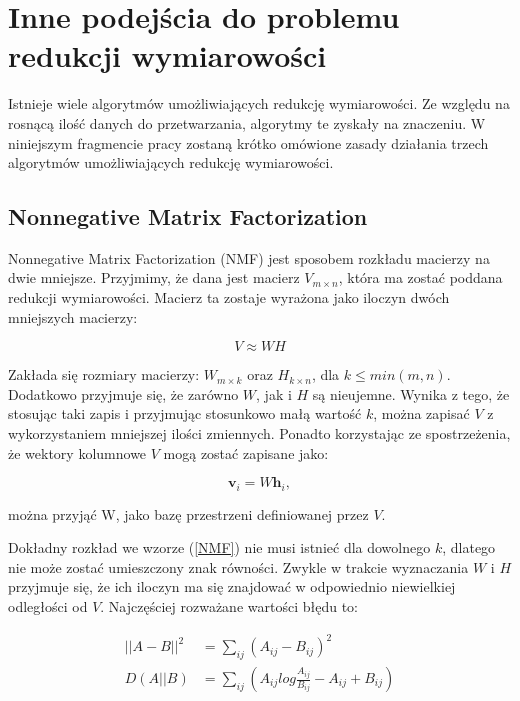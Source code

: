 \documentclass[oneside, eng]{mgr}
\newcommand{\bb}{\textbf}
\begin{document}
\section{Inne podejścia do problemu redukcji wymiarowości}
Istnieje wiele algorytmów umożliwiających redukcję wymiarowości. Ze względu na rosnącą ilość danych do przetwarzania, algorytmy te zyskały na znaczeniu. W niniejszym fragmencie pracy zostaną krótko omówione zasady działania trzech algorytmów umożliwiających redukcję wymiarowości.

\subsection{Nonnegative Matrix Factorization}

Nonnegative Matrix Factorization (NMF) jest sposobem rozkładu macierzy na dwie mniejsze. Przyjmimy, że dana jest macierz $V_{m \times n}$, która ma zostać poddana redukcji wymiarowości. Macierz ta zostaje wyrażona jako iloczyn dwóch mniejszych macierzy:

\begin{equation}
	V \approx WH
\label{NMF}
\end{equation}

Zakłada się rozmiary macierzy: $W_{m \times k}$ oraz $H_{k \times n}$, dla $k \leq min(m,n)$. Dodatkowo przyjmuje się, że zarówno $W$, jak i $H$ są nieujemne. Wynika z tego, że stosując taki zapis i przyjmując stosunkowo małą wartość $k$, można zapisać $V$ z wykorzystaniem mniejszej ilości zmiennych. Ponadto korzystając ze spostrzeżenia, że wektory kolumnowe $V$ mogą zostać zapisane jako:

\begin{equation}
	\bb{v}_i = W \bb{h}_i,
\end{equation}

można przyjąć W, jako bazę przestrzeni definiowanej przez $V$.

Dokładny rozkład we wzorze (\ref{NMF}) nie musi istnieć dla dowolnego $k$, dlatego nie może zostać umieszczony znak równości. Zwykle w trakcie wyznaczania $W$ i $H$ przyjmuje się, że ich iloczyn ma się znajdować w odpowiednio niewielkiej odległości od $V$. Najczęściej rozważane wartości błędu to:

\begin{align*}
	||A - B||^2 &= \sum_{ij} (A_{ij} - B_{ij})^2 \\
	  D(A||B)   &= \sum_{ij} (A_{ij} log \frac{A_{ij}}{B_{ij}} - A_{ij} + B_{ij})
\end{align*}
\end{document}
